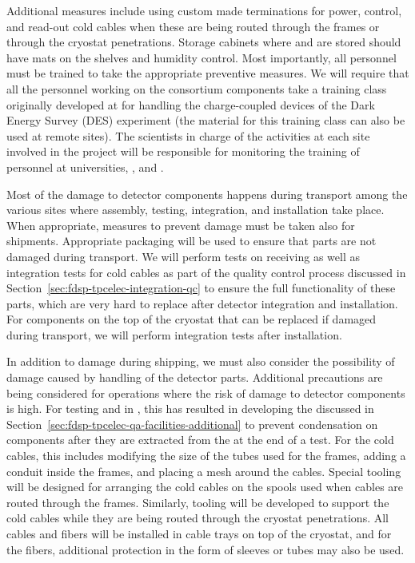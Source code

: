 Additional measures
include using custom made terminations for 
power, control, and read-out cold cables when these
are being routed through the  frames or through the
cryostat penetrations. Storage cabinets where  and
 are stored should have  mats
on the shelves and humidity control. Most importantly, all personnel must be trained to take the appropriate preventive measures. We 
will require that all the personnel working on the  
consortium components take a training class originally developed 
at  for handling the charge-coupled devices of the Dark Energy Survey (DES) experiment 
(the material for this training class can also be used at remote 
sites). The scientists in charge of the  activities at each site involved in the project will be responsible for monitoring the training of personnel at universities, 
, and .

Most of the damage to detector components happens during 
transport among the various sites where assembly, testing, integration,
and installation take place. When appropriate, measures to prevent
 damage must be taken also for shipments. Appropriate 
packaging will be used to ensure that parts are not damaged
during transport. We will perform tests on receiving  
 as well as integration tests for cold cables as
part of the quality control process discussed in 
Section~\ref{sec:fdsp-tpcelec-integration-qc} to ensure the 
full functionality of these parts, which are very hard to replace 
after detector integration and installation. For  
components on the top of the cryostat that
can be replaced if damaged during transport, we will 
perform integration tests after installation.

In addition to damage during shipping, we must also consider the
possibility of damage caused by handling of the detector parts.
Additional precautions are being considered for operations where
the risk of damage to  detector components is
high. For testing  and  
in \lntwo, this has resulted in developing the
 discussed in Section~\ref{sec:fdsp-tpcelec-qa-facilities-additional}
to prevent condensation on components after they are extracted from
the \lntwo at the end of a test. For the cold cables, this 
includes modifying the size of the tubes used for the  frames,
adding a conduit inside the frames, and placing a mesh around 
the cables. Special tooling will be designed for arranging the
cold cables on the spools used when cables are routed through
the  frames. Similarly, tooling will be developed to 
support the cold cables while they are being routed through the 
cryostat penetrations. All cables and fibers will
be installed in cable trays on top of the cryostat, and for the fibers, additional protection in the form of sleeves or tubes 
may also be used. 

